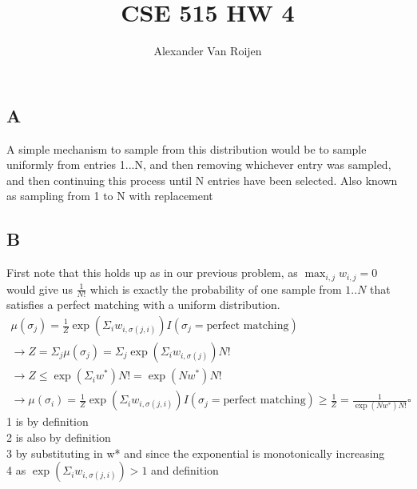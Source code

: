 \documentclass[12pt]{article}
\begin{document}
	
\title{%
	CSE 515 HW 4}

\author{ Alexander Van Roijen}

\maketitle	
\begin{section}{8.1}
	\subsection{A}
	A simple mechanism to sample from this distribution would be to sample uniformly from entries 1...N, and then removing whichever entry was sampled, and then continuing this process until N entries have been selected. Also known as sampling from 1 to N with replacement
	\subsection{B}
	First note that this holds up as in our previous problem, as $\max_{i,j}w_{i,j}=0$ would give us $\frac{1}{N!}$ which is exactly the probability of one sample from $1..N$ that satisfies a perfect matching with a uniform distribution.
	\\
	\begin{gather}
		\mu(\sigma_j) = \frac{1}{Z}\exp(\Sigma_{i}w_{i,\sigma(j,i)})I(\sigma_j = \text{perfect matching})\\
		\rightarrow Z = \Sigma_j \mu(\sigma_j) = \Sigma_j\exp(\Sigma_{i}w_{i,\sigma(j)})N!\\
		\rightarrow Z \le \exp(\Sigma_{i}w^*)N! = \exp(Nw^*)N! \\
		\rightarrow \mu(\sigma_i) = \frac{1}{Z}\exp(\Sigma_{i}w_{i,\sigma(j,i)})I(\sigma_j = \text{perfect matching})  \ge \frac{1}{Z} 
		 =  \frac{1}{\exp(Nw^*)N!}\square
	\end{gather}
	1 is by definition\\
	2 is also by definition\\
	3 by substituting in w* and since the exponential is monotonically increasing\\
	4 as $ \exp(\Sigma_{i}w_{i,\sigma(j,i)}) > 1$ and definition\\

\end{section}
\end{document}
